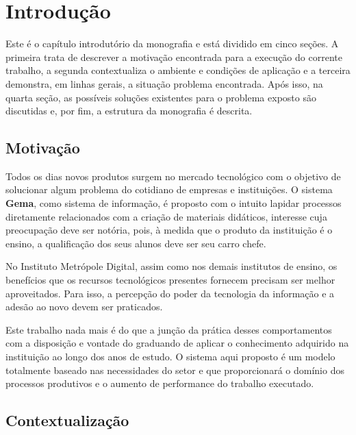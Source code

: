 \chapter{Introdução}

Este é o capítulo introdutório da monografia e está dividido em cinco seções. A primeira trata de descrever a motivação encontrada para a execução do corrente trabalho, a segunda contextualiza o ambiente e condições de aplicação e a terceira demonstra, em linhas gerais, a situação problema encontrada. Após isso, na quarta seção, as possíveis soluções existentes para o problema exposto são discutidas e, por fim, a estrutura da monografia é descrita.


\section{Motivação}

Todos os dias novos produtos surgem no mercado tecnológico com o objetivo de solucionar algum problema do cotidiano de empresas e instituições. O sistema \textbf{Gema}, como sistema de informação, é proposto com o intuito lapidar processos diretamente relacionados com a criação de materiais didáticos, interesse cuja preocupação deve ser notória, pois, à medida que o produto da instituição é o ensino, a qualificação dos seus alunos deve ser seu carro chefe.

No Instituto Metrópole Digital, assim como nos demais institutos de ensino, os benefícios que os recursos tecnológicos presentes fornecem precisam ser melhor aproveitados. Para isso, a percepção do poder da tecnologia da informação e a adesão ao novo devem ser praticados. 

Este trabalho nada mais é do que a junção da prática desses comportamentos com a disposição e vontade do graduando de aplicar o conhecimento adquirido na instituição ao longo dos anos de estudo. O sistema aqui proposto é um modelo totalmente baseado nas necessidades do setor e que proporcionará o domínio dos processos produtivos e o aumento de performance do trabalho executado.

\section{Contextualização}

